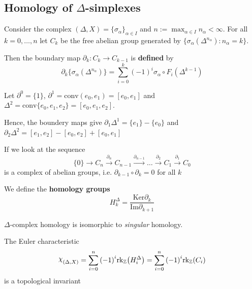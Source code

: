 \subsection{Homology of \(\Delta\)-simplexes}

Consider the complex \({(\Delta, X)} = \{\sigma_{\alpha} \} _{\alpha \in I} \)
and \(n := \max_{\alpha \in I} n_{\alpha} < \infty\). For all \(k = 0, \dots,
n\) let \(C_k\) be the free abelian group generated by \(\{\sigma_{\alpha}
{(\Delta^{n_{\alpha} })} : n_{\alpha} = k\} \).

Then the boundary map \(\partial_k : C_k \to C_{k-1} \) is \textbf{defined} by
\[
  \partial_k \{\sigma_{\alpha} {(\Delta^{n_{\alpha} })}\} = \sum_{i=0}^{k}
  {(-1)}^{i} \sigma_{\alpha} \circ F_{i}{\left( \Delta^{k-1} \right)}  
\]

\begin{example}{}
    Let \(\partial^{0} = \{1\} \), \(\partial^{1} = \mathrm{conv}{(e_{0},
    e_{1})} = [e_{0}, e_{1}]\) and \(\Delta^2 = \mathrm{conv} \{e_{0}, e_{1},
e_{2}\} = [e_{0}, e_{1}, e_{2}]\).

    Hence, the boundery maps give \(\partial_{1}\Delta^{1} = \{e_{1}\} -
    \{e_{0}\} \) and \(\partial_{2}\Delta^2 = [e_{1}, e_{2}] - [e_{0}, e_{2}] +
    [e_{0}, e_{1}]\) 
\end{example}

\begin{proposition}{}
    If we look at the sequence
    \[
      \{0\} \to C_{n} \overset{\partial_{n}}{\to} C_{n-1}
      \overset{\partial_{n-1} }{\to} \dots \overset{\partial_{2}}{\to} C_{1}
      \overset{\partial_{1}}{\to} C_{0}
    \]
    is a complex of abelian groups, i.e. \(\partial_{k-1} \circ \partial_k = 0\)
    for all \(k\) 
\end{proposition}

\begin{definition}{}
    We define the \textbf{homology groups}
    \[
      H_{k} ^{\Delta} = \frac{\mathrm{Ker}\partial_k}{\mathrm{Im} \partial_{k+1} }
    \]
\end{definition}

\begin{theorem}{}
    \(\Delta\)-complex homology is isomorphic to \emph{singular} homology.
\end{theorem}

\begin{definition}{}
    The Euler characteristic
    \[
      \rchi_{{(\Delta, X)}} = \sum_{i=0}^{n} {(-1)}^{i} \mathrm{rk}_{\mathbb{Z}}
      {\left( H_{i}^{\Delta} \right)} = \sum_{i=0}^{n} {(-1)}^{i}
      \mathrm{rk}_{\mathbb{Z}} {(C_{i})} 
    \]
    is a topological invariant
\end{definition}

